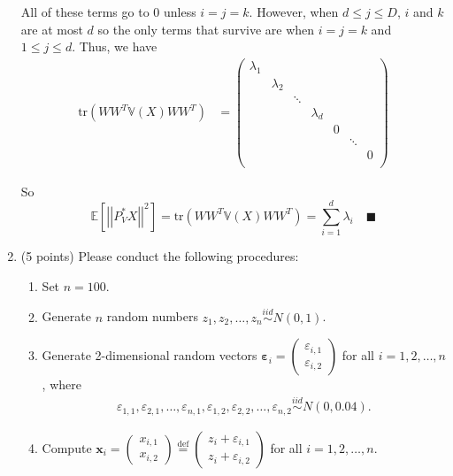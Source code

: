 \documentclass[11pt,letterpaper, leqno]{article}
\numberwithin{equation}{section}
\numberwithin{theorem}{section}
\numberwithin{lemma}{section}
\numberwithin{corollary}{section}
\numberwithin{definition}{section}
\numberwithin{proposition}{section}
\numberwithin{remark}{section}
\numberwithin{example}{section}
\newcommand{\E}{\mathbb{E}}
\renewcommand{\qed}{\quad \blacksquare}
\newcommand{\abs}[1]{\left\vert #1 \right\vert}
\newcommand{\V}{\mathbb{V}}
\begin{document}
\begin{enumerate}
            All of these terms go to $0$ unless $i = j = k$. However, when $d \leq j \leq D$, $i$ and $k$ are at most $d$ so the only terms that survive are when $i = j = k$ and $1 \leq j \leq d$. Thus, we have
            \begin{align*}
                \text{tr}(WW^T \V(X) WW^T) &= \begin{pmatrix}
                    \lambda_1 \\
                    & \lambda_2\\
                    & &\ddots\\ 
                    &  &  & \lambda_d \\
                    &  &  &  & 0 \\
                    &  &  &  &  & \ddots\\ 
                    & &  &  &  &  & 0\\
                \end{pmatrix}
            \end{align*}

            So 
            \[\E[\abs{\abs{P_V^* X}}^2] = \text{tr}(WW^T \V(X) WW^T) = \sum_{i=1}^d \lambda_i \qed\]
        \color{black}
        
    \item (5 points) Please conduct the following procedures:
    \begin{enumerate}
    \item Set $n=100$.
        \item Generate $n$ random numbers $z_1, z_2, \ldots,z_n\overset{iid}{\sim} N(0,1)$.
        \item Generate 2-dimensional random vectors $\boldsymbol{\varepsilon}_i=
        \begin{pmatrix}
            \varepsilon_{i,1} \\
            \varepsilon_{i,2}
        \end{pmatrix}$ for all $i=1,2,\ldots,n$, where 
        \begin{align*}
            \varepsilon_{1,1}, \varepsilon_{2,1}, \ldots, \varepsilon_{n,1}, \varepsilon_{1,2}, \varepsilon_{2,2}, \ldots, \varepsilon_{n,2} \overset{iid}{\sim} N(0,0.04).
        \end{align*}
        \item Compute $\boldsymbol{x}_i=\begin{pmatrix}
            x_{i,1} \\
            x_{i,2}
        \end{pmatrix} \overset{\operatorname{def}}{=}
        \begin{pmatrix}
            z_i + \varepsilon_{i,1} \\
            z_i + \varepsilon_{i,2}
        \end{pmatrix}$ for all $i=1,2,\ldots,n$.


\end{enumerate}
\end{enumerate}
\end{document}
